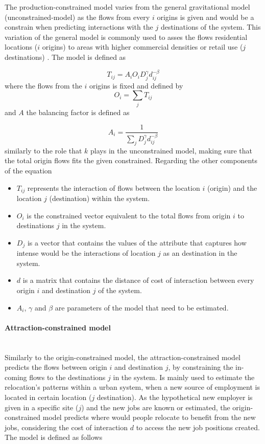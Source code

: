 \documentclass{article}
\begin{document}
The production-constrained model varies from the general gravitational model (unconstrained-model) as the flows from every $i$ origins is given and would be a constrain when predicting interactions with the $j$ destinations of the system. This variation of the general model is commonly used to asses the flows residential locations ($i$ origins) to areas with higher commercial densities or retail use ($j$ destinations) \citep{wilkinsonSpatialInteractionModelling2023}. The model is defined as

\[T_{ij} = A_i O_i D_j^\gamma d_{ij}^{-\beta}\] where the flows from the $i$ origins is fixed and defined by \[O_i = \sum_j T_{ij}\] and $A$ the balancing factor is defined as

\[A_i = \frac{1}{\sum_j D_j^\gamma d_{ij}^{-\beta}}\] similarly to the role that $k$ plays in the unconstrained model, making sure that the total origin flows fits the given constrained.  Regarding the other components of the equation

\begin{itemize}
  \item $T_{ij}$ represents the interaction of flows between the location $i$ (origin) and the location $j$ (destination) within the system. 
  \item $O_{i}$ is the constrained vector equivalent to the total flows from origin $i$ to destinations $j$ in the system.
  \item $D_{j}$ is a vector that contains the values of the attribute that captures how intense would be the interactions of location $j$ as an destination in the system.
    \item $d$ is a matrix that contains the distance of cost of interaction between every origin $i$ and destination $j$ of the system.
    \item $A_{i}$, $\gamma$ and $\beta$ are parameters of the model that need to be estimated.
\end{itemize}

\paragraph{Attraction-constrained model}\mbox{}\\

Similarly to the origin-constrained model, the attraction-constrained model predicts the flows between origin $i$ and destination $j$, by constraining the in-coming flows to the destinations $j$ in the system. Is mainly used to estimate the relocation's patterns within a urban system, when a new source of employment is located in certain location ($j$ destination). As the hypothetical new employer is given in a specific site ($j$) and the new jobs are known or estimated, the origin-constrained model predicts where would people relocate to benefit from the new jobs, considering the  cost of interaction $d$ to access the new job positions created. The model is defined as follows
\end{document}
